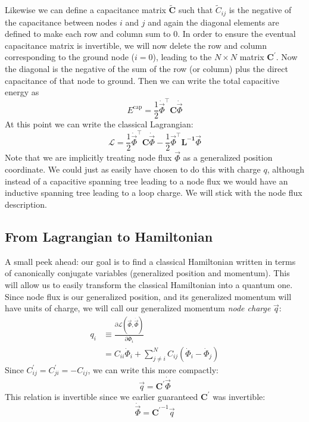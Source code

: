 Likewise we can define a capacitance matrix $\mathbf{\tilde{C}}$ such that $\tilde{C}_{ij}$ is the negative of the capacitance between nodes $i$ and $j$ and again the diagonal elements are defined to make each row and column sum to 0. In order to ensure the eventual capacitance matrix is invertible, we will now delete the row and column corresponding to the ground node ($i=0$), leading to the $N \times N$ matrix $\mathbf{C^\prime}$. Now the diagonal is the negative of the sum of the row (or column) plus the direct capacitance of that node to ground. Then we can write the total capacitive energy as
\begin{equation}
    \label{eq:matrixEcapflux}
    E^\mathrm{cap} = \frac{1}{2}\dot{\vec{\Phi}}^\top\mathbf{C}\dot{\vec{\Phi}}
\end{equation}
At this point we can write the classical Lagrangian:
\begin{equation}
    \label{eq:Lagrangianfluxonly}
    \mathcal{L} = \frac{1}{2}\dot{\vec{\Phi}}^\top\mathbf{C}\dot{\vec{\Phi}}-\frac{1}{2}\vec{\Phi}^\top\mathbf{L^{-1}}\vec{\Phi}
\end{equation}
Note that we are implicitly treating node flux $\vec{\Phi}$ as a generalized position coordinate. We could just as easily have chosen to do this with charge $q$, although instead of a capacitive spanning tree leading to a node flux we would have an inductive spanning tree leading to a loop charge. We will stick with the node flux description.

\subsection{From Lagrangian to Hamiltonian}
A small peek ahead: our goal is to find a classical Hamiltonian written in terms of canonically conjugate variables (generalized position and momentum). This will allow us to easily transform the classical Hamiltonian into a quantum one. Since node flux is our generalized position, and its generalized momentum will have units of charge, we will call our generalized momentum \textit{node charge} $\vec{q}$:
\begin{align}
    q_i &\equiv \frac{\partial\mathcal{L}(\vec\Phi,\dot{\vec{\Phi}})}{\partial\dot{\Phi_i}} \\
    &=C_{ii}\dot{\Phi}_i+\sum_{j\neq i}^N C_{ij}(\dot{\Phi}_i-\dot{\Phi}_j)
\end{align}
Since $C^\prime_{ij} = C^\prime_{ji}=-C_{ij}$, we can write this more compactly:
\begin{equation}
    \vec{q}=\mathbf{C^\prime}\dot{\vec{\Phi}}
\end{equation}
This relation is invertible since we earlier guaranteed $\mathbf{C^\prime}$ was invertible:
\begin{equation}
    \dot{\vec{\Phi}}= \mathbf{C^\prime}^{-1}\vec{q}
\end{equation}


